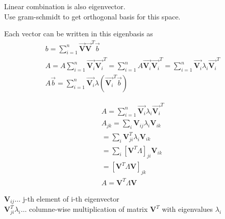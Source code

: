     
    Linear combination is also eigenvector.\\
    Use gram-schmidt to get orthogonal basis for this space.\\
    \vspace{10px}
    
    Each vector can be written in this eigenbasis as \\
    
    \begin{equation*}
      \begin{array}{l}
        b = \sum_{i=1}^{n}\Vec{\mathbf{V}}\Vec{\mathbf{V}}^T \Vec{b}\\ 
        A = A \sum_{i=1}^{n}\Vec{\mathbf{V}_{i}}\Vec{\mathbf{V}_{i}}^T = \sum_{i=1}^{n}A\Vec{\mathbf{V}_{i}}\Vec{\mathbf{V}_{i}}^T = \sum_{i=1}^{n}\Vec{\mathbf{V}_{i}}\lambda_{i}\Vec{\mathbf{V}_{i}}^T\\
        A\Vec{b} = \sum_{i=1}^{n}\Vec{\mathbf{V}_{i}}\lambda(\Vec{\mathbf{V}_{i}}^T \Vec{b})
      \end{array}
    \end{equation*}
    
    \vspace{5px}
    
    
    \begin{equation*}
      \begin{array}{l}
        A = \sum_{i=1}^{n}\Vec{\mathbf{V}_{i}}\lambda_{i}\Vec{\mathbf{\mathbf{V}}_{i}}^T\\
        A_{jk} = \sum_{i}^{}\mathbf{V}_{ij}\lambda_{i}\mathbf{V}_{ik}\\
        =\sum_{i}^{}\mathbf{V}_{ji}^T\lambda_{i}\mathbf{V}_{ik}\\
        =\sum_{i}^{}[\mathbf{V}^T \Lambda]_{ji} \mathbf{V}_{ik}\\
        =[\mathbf{V}^T \Lambda \mathbf{V}]_{jk}\\
        A = \mathbf{V}^T \Lambda \mathbf{V}
      \end{array}
    \end{equation*}
    
    $\mathbf{V}_{ij} \hdots $ j-th element of i-th eigenvector\\
    $\mathbf{V}_{ji}^T \lambda_{i} \hdots$ columne-wise multiplication of matrix  $\mathbf{V}^T$ with eigenvalues $\lambda_{i}$\\
    
